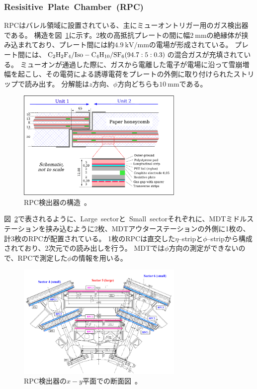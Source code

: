 \subsubsection{Resisitive~Plate~Chamber~(RPC)}
RPCはバレル領域に設置されている、主にミューオントリガー用のガス検出器である。
構造を図~\ref{fig:2-18}に示す。2枚の高抵抗プレートの間に幅$\SI{2}{\mm}$の絶縁体が挟み込まれており、プレート間には約$\SI{4.9}{\kV/\mm}$の電場が形成されている。
プレート間には、$\rm{C_{2}H_{2}F_{4}/Iso - C_{4}H_{10}/SF_{6}(94.7 : 5 : 0.3)}$の混合ガスが充填されている。
ミューオンが通過した際に、ガスから電離した電子が電場に沿って雪崩増幅を起こし、その電荷による誘導電荷をプレートの外側に取り付けられたストリップで読み出す。
分解能は$z$方向、$\phi$方向どちらも$\SI{10}{\mm}$である。

\begin{figure}[h]
  \centering
  \includegraphics[clip, width=8cm]{fig/2/RPC_structure.pdf}
  \caption{RPC検出器の構造~\cite{Aad:1129811}。}
  \label{fig:2-18}
\end{figure}

図~\ref{fig:2-19}で表されるように、Large~sectorと~Small~sectorそれぞれに、MDTミドルステーションを挟み込むように2枚、MDTアウターステーションの外側に1枚の、計3枚のRPCが配置されている。
1枚のRPCは直交した$\eta$--stripと$\phi$--stripから構成されており、2次元での読み出しを行う。
MDTでは$\phi$方向の測定ができないので、RPCで測定した$\phi$の情報を用いる。

\begin{figure}[h]
  \centering
  \includegraphics[clip, width=8cm]{fig/2/RPC_xy.pdf}
  \caption{RPC検出器の$x-y$平面での断面図~\cite{Aad:1129811}。}
  \label{fig:2-19}
\end{figure}

